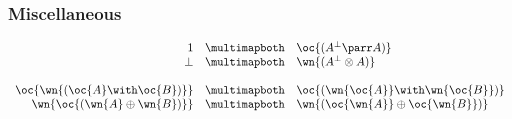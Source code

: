 \subsubsection{Miscellaneous}\label{miscellaneous}

\(\begin{array}{rcl}
  \one & \linequiv&  \oc{(A\orth\parr A)} \\
  \bot & \linequiv&  \wn{(A\orth\tens A)} \\
\\
  \oc{\wn{(\oc{A}\with\oc{B})}} & \linequiv&  \oc{(\wn{\oc{A}}\with\wn{\oc{B}})} \\
  \wn{\oc{(\wn{A}\plus\wn{B})}} & \linequiv&  \wn{(\oc{\wn{A}}\plus\oc{\wn{B}})}
\end{array}\)


